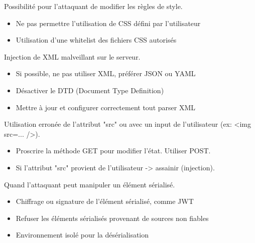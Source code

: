 \documentclass[a4paper]{article}
\begin{document}
\begin{attaque}
    Possibilité pour l’attaquant de modifier les règles de style.
    \begin{itemize}
        \item Ne pas permettre l’utilisation de CSS défini par l’utilisateur
        \item Utilisation d’une whitelist des fichiers CSS autorisés
    \end{itemize}
\end{attaque}

\begin{attaque}
    Injection de XML malveillant sur le serveur.
    \begin{itemize}
        \item Si possible, ne pas utiliser XML, préférer JSON ou YAML
        \item Désactiver le DTD (Document Type Definition)
        \item Mettre à jour et configurer correctement tout parser XML
    \end{itemize}
\end{attaque}

\begin{attaque}
    Utilisation erronée de l’attribut "src" ou avec un input de l’utilisateur (ex: <img src=... />).
    \begin{itemize}
        \item Proscrire la méthode GET pour modifier l’état. Utiliser POST.
        \item Si l’attribut "src" provient de l’utilisateur -> assainir (injection).
    \end{itemize}
\end{attaque}

\begin{attaque}
    Quand l’attaquant peut manipuler un élément sérialisé.
    \begin{itemize}
        \item Chiffrage ou signature de l’élément sérialisé, comme JWT
        \item Refuser les éléments sérialisés provenant de sources non fiables
        \item Environnement isolé pour la désérialisation
    \end{itemize}
\end{attaque}
\end{document}
